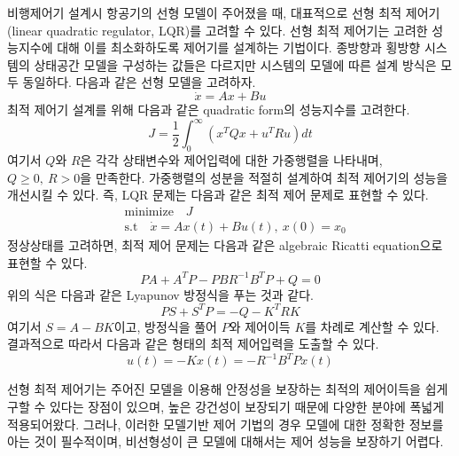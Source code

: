 \documentclass[a4paper, 12pt]{report}
\begin{document}
	비행제어기 설계시 항공기의 선형 모델이 주어졌을 때, 대표적으로 선형 최적 제어기(linear quadratic regulator, LQR)를 고려할 수 있다.
	선형 최적 제어기는 고려한 성능지수에 대해 이를 최소화하도록 제어기를 설계하는 기법이다. 
	종방향과 횡방향 시스템의 상태공간 모델을 구성하는 값들은 다르지만 시스템의 모델에 따른 설계 방식은 모두 동일하다. 
	다음과 같은 선형 모델을 고려하자.
	\begin{equation}
		\dot{x}=Ax+Bu
	\end{equation}
	최적 제어기 설계를 위해 다음과 같은 quadratic form의 성능지수를 고려한다.
	\begin{equation}
		J=\frac{1}{2}\int_0^{\infty}(x^TQx+u^TRu)dt
	\end{equation}
	여기서 $Q$와 $R$은 각각 상태변수와 제어입력에 대한 가중행렬을 나타내며, $Q\geq0,\ R>0$을 만족한다. 
	가중행렬의 성분을 적절히 설계하여 최적 제어기의 성능을 개선시킬 수 있다.
	즉, LQR 문제는 다음과 같은 최적 제어 문제로 표현할 수 있다.
	\begin{equation}
		\begin{aligned}
		&\mathrm{minimize} \hspace{1em} J\\
		&\mathrm{s.t} \hspace{1em} \dot{x}=Ax(t)+Bu(t),\ x(0)=x_0
		\end{aligned}
	\end{equation}
	정상상태를 고려하면, 최적 제어 문제는 다음과 같은 algebraic Ricatti equation으로 표현할 수 있다.
	\begin{equation}
		PA+A^TP-PBR^{-1}B^TP+Q=0
	\end{equation}
	위의 식은 다음과 같은 Lyapunov 방정식을 푸는 것과 같다.
	\begin{equation}
		PS+S^TP=-Q-K^TRK
	\end{equation}
	여기서 $S=A-BK$이고, 방정식을 풀어 $P$와 제어이득 $K$를 차례로 계산할 수 있다.
	결과적으로 따라서 다음과 같은 형태의 최적 제어입력을 도출할 수 있다.
	\begin{equation}
		u(t)=-Kx(t)=-R^{-1}B^TPx(t)
	\end{equation}
	
	선형 최적 제어기는 주어진 모델을 이용해 안정성을 보장하는 최적의 제어이득을 쉽게 구할 수 있다는 장점이 있으며, 높은 강건성이 보장되기 때문에 다양한 분야에 폭넓게 적용되어왔다.
	그러나, 이러한 모델기반 제어 기법의 경우 모델에 대한 정확한 정보를 아는 것이 필수적이며, 비선형성이 큰 모델에 대해서는 제어 성능을 보장하기 어렵다.
	
\end{document}
